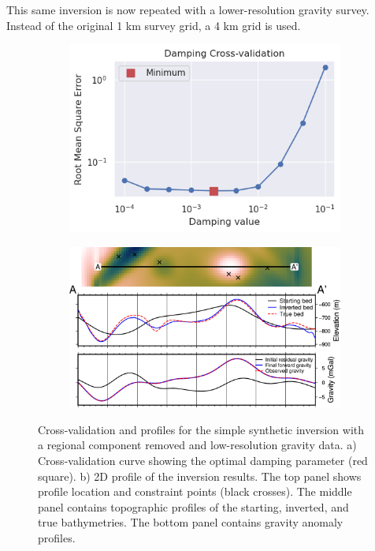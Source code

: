 This same inversion is now repeated with a lower-resolution gravity survey. Instead of the original 1 km survey grid, a 4 km grid is used. 

\begin{figure}[!ht]
  \centering
    \begin{subfigure}[t]{.40\textwidth}
        \centering
        \includegraphics[width=\textwidth]{figures/chp3/chp3_simple_regional_sampled_CV.png}
        \caption{}
    \end{subfigure}
    \begin{subfigure}[t]{.58\textwidth}
        \centering
        \includegraphics[width=\textwidth]{figures/chp3/chp3_simple_regional_sampled_profile.png}
        \caption{}
    \end{subfigure}
  \caption[Synthetic inversion with regional and re-sampling, CV and profile]{Cross-validation and profiles for the simple synthetic inversion with a regional component removed and low-resolution gravity data. a) Cross-validation curve showing the optimal damping parameter (red square). b) 2D profile of the inversion results. The top panel shows profile location and constraint points (black crosses). The middle panel contains topographic profiles of the starting, inverted, and true bathymetries. The bottom panel contains gravity anomaly profiles.}
    \label{fig:appB_simple_regional_sampled_CV_and_profile}
\end{figure}


